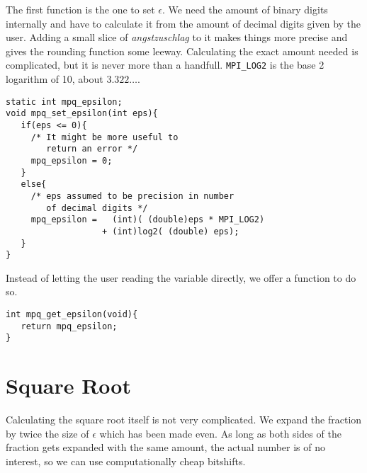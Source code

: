\documentclass[10pt]{book}
\theoremstyle{definition}
\theoremstyle{remark}
\begin{document}
The first function is the one to set $\epsilon$. We need the amount of binary
digits internally and have to calculate it from the amount of decimal digits
given by the user. Adding a small slice of \textit{angstzuschlag} to it
makes things more precise and gives the rounding function some leeway.
Calculating the exact amount needed is complicated, but it is never more than a
handfull. \lstinline!MPI_LOG2! is the base 2 logarithm of 10, about
$3.322\ldots$.
 \begin{center}
    \begin{lstlisting}[caption={Set $\epsilon$},label=setepsrat]
static int mpq_epsilon;
void mpq_set_epsilon(int eps){
   if(eps <= 0){
     /* It might be more useful to
        return an error */
     mpq_epsilon = 0;
   }
   else{
     /* eps assumed to be precision in number
        of decimal digits */
     mpq_epsilon =   (int)( (double)eps * MPI_LOG2) 
                   + (int)log2( (double) eps);
   }
}
    \end{lstlisting}
  \end{center}
Instead of letting the user reading the variable directly, we offer a function
to do so.
 \begin{center}
    \begin{lstlisting}[caption={Read $\epsilon$},label=readepsrat]
int mpq_get_epsilon(void){
   return mpq_epsilon;
}
    \end{lstlisting}
  \end{center}
\section{Square Root}
Calculating the square root itself is not very complicated. We expand the fraction
by twice the size of $\epsilon$ which has been made even. As long as both sides
of the fraction gets expanded with the same amount, the actual number is of no
interest, so we can use computationally cheap bitshifts.
\end{document}
